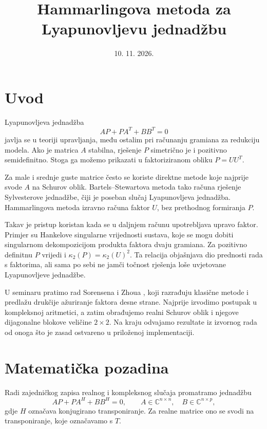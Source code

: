 \documentclass[12pt,a4paper]{article}
\title{Hammarlingova metoda za Lyapunovljevu jednadžbu}
\author{}
\date{10. 11. 2026.}
\begin{document}
\maketitle

\section{Uvod}

Lyapunovljeva jednadžba
\[
AP + PA^{T} + BB^{T} = 0
\]
javlja se u teoriji upravljanja, među ostalim pri računanju gramiana za redukciju modela. Ako je matrica $A$ stabilna, rješenje $P$ simetrično je i pozitivno semidefinitno. Stoga ga možemo prikazati u faktoriziranom obliku $P = UU^{T}$.

Za male i srednje guste matrice često se koriste direktne metode koje najprije svode $A$ na Schurov oblik. Bartels--Stewartova metoda \cite{bartels} tako računa rješenje Sylvesterove jednadžbe, čiji je poseban slučaj Lyapunovljeva jednadžba. Hammarlingova metoda \cite{hammarling} izravno računa faktor $U$, bez prethodnog formiranja $P$.

Takav je pristup koristan kada se u daljnjem računu upotrebljava upravo faktor. Primjer su Hankelove singularne vrijednosti sustava, koje se mogu dobiti singularnom dekompozicijom produkta faktora dvaju gramiana. Za pozitivno definitnu $P$ vrijedi i $\kappa_2(P) = \kappa_2(U)^2$. Ta relacija objašnjava dio prednosti rada s faktorima, ali sama po sebi ne jamči točnost rješenja loše uvjetovane Lyapunovljeve jednadžbe.

U seminaru pratimo rad Sorensena i Zhoua \cite{sorensen}, koji razrađuju klasične metode i predlažu drukčije ažuriranje faktora desne strane. Najprije izvodimo postupak u kompleksnoj aritmetici, a zatim obrađujemo realni Schurov oblik i njegove dijagonalne blokove veličine $2\times 2$. Na kraju odvajamo rezultate iz izvornog rada od onoga što je zasad ostvareno u priloženoj implementaciji.

\section{Matematička pozadina}

Radi zajedničkog zapisa realnog i kompleksnog slučaja promatramo jednadžbu
\[
AP + PA^{H} + BB^{H} = 0, \qquad
A \in \mathbb{C}^{n\times n}, \quad B \in \mathbb{C}^{n\times p},
\]
gdje $H$ označava konjugirano transponiranje. Za realne matrice ono se svodi na transponiranje, koje označavamo s $T$.
\end{document}
